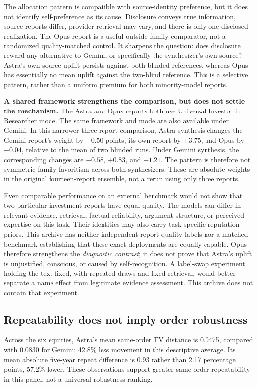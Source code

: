 \documentclass[11pt]{article}
\begin{document}
The allocation pattern is compatible with source-identity preference, but it does not identify self-preference as its cause. Disclosure conveys true information, source reports differ, provider retrieval may vary, and there is only one disclosed realization. The Opus report is a useful outside-family comparator, not a randomized quality-matched control. It sharpens the question: does disclosure reward any alternative to Gemini, or specifically the synthesizer's own source? Astra's own-source uplift persists against both blinded references, whereas Opus has essentially no mean uplift against the two-blind reference. This is a selective pattern, rather than a uniform premium for both minority-model reports.

\textbf{A shared framework strengthens the comparison, but does not settle the mechanism.} The Astra and Opus reports both use Universal Investor in Researcher mode. The same framework and mode are also available under Gemini. In this narrower three-report comparison, Astra synthesis changes the Gemini report's weight by $-0.50$ points, its own report by $+3.75$, and Opus by $-0.04$, relative to the mean of two blinded runs. Under Gemini synthesis, the corresponding changes are $-0.58$, $+0.83$, and $+1.21$. The pattern is therefore not symmetric family favoritism across both synthesizers. These are absolute weights in the original fourteen-report ensemble, not a rerun using only three reports.

Even comparable performance on an external benchmark would not show that two particular investment reports have equal quality. The models can differ in relevant evidence, retrieval, factual reliability, argument structure, or perceived expertise on this task. Their identities may also carry task-specific reputation priors. This archive has neither independent report-quality labels nor a matched benchmark establishing that these exact deployments are equally capable. Opus therefore strengthens the \emph{diagnostic contrast}; it does not prove that Astra's uplift is unjustified, conscious, or caused by self-recognition. A label-swap experiment holding the text fixed, with repeated draws and fixed retrieval, would better separate a name effect from legitimate evidence assessment. This archive does not contain that experiment.

\subsection{Repeatability does not imply order robustness}
Across the six equities, Astra's mean same-order TV distance is 0.0475, compared with 0.0830 for Gemini: 42.8\% less movement in this descriptive average. Its mean absolute five-year repeat difference is 0.93 rather than 2.17 percentage points, 57.2\% lower. These observations support greater same-order repeatability in this panel, not a universal robustness ranking.
\end{document}
